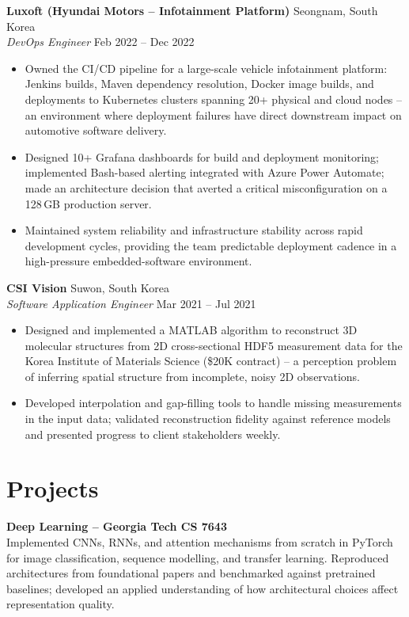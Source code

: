 \documentclass[10pt,a4paper]{article}
\begin{document}
\vspace{4pt}
\textbf{Luxoft (Hyundai Motors -- Infotainment Platform)} \hfill Seongnam, South Korea \\
\textit{DevOps Engineer} \hfill Feb 2022 -- Dec 2022
\begin{itemize}
    \item Owned the CI/CD pipeline for a large-scale vehicle infotainment platform: Jenkins builds, Maven dependency resolution, Docker image builds, and deployments to Kubernetes clusters spanning 20+ physical and cloud nodes -- an environment where deployment failures have direct downstream impact on automotive software delivery.
    \item Designed 10+ Grafana dashboards for build and deployment monitoring; implemented Bash-based alerting integrated with Azure Power Automate; made an architecture decision that averted a critical misconfiguration on a 128\,GB production server.
    \item Maintained system reliability and infrastructure stability across rapid development cycles, providing the team predictable deployment cadence in a high-pressure embedded-software environment.
\end{itemize}

\vspace{4pt}
\textbf{CSI Vision} \hfill Suwon, South Korea \\
\textit{Software Application Engineer} \hfill Mar 2021 -- Jul 2021
\begin{itemize}
    \item Designed and implemented a MATLAB algorithm to reconstruct 3D molecular structures from 2D cross-sectional HDF5 measurement data for the Korea Institute of Materials Science (\$20K contract) -- a perception problem of inferring spatial structure from incomplete, noisy 2D observations.
    \item Developed interpolation and gap-filling tools to handle missing measurements in the input data; validated reconstruction fidelity against reference models and presented progress to client stakeholders weekly.
\end{itemize}

\section*{Projects}

\textbf{Deep Learning -- Georgia Tech CS 7643} \\
Implemented CNNs, RNNs, and attention mechanisms from scratch in PyTorch for image classification, sequence modelling, and transfer learning. Reproduced architectures from foundational papers and benchmarked against pretrained baselines; developed an applied understanding of how architectural choices affect representation quality.
\end{document}
